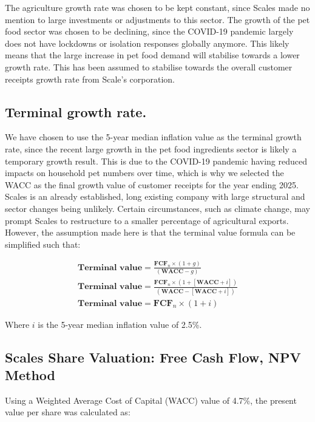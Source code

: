 \documentclass{article}
\begin{document}
The agriculture growth rate was chosen to be kept constant, since Scales made no mention to large investments or adjustments to this sector. The growth of the pet food sector was chosen to be declining, since the COVID-19 pandemic largely does not have lockdowns or isolation responses globally anymore. This likely means that the large increase in pet food demand will stabilise towards a lower growth rate. This has been assumed to stabilise towards the overall customer receipts growth rate from Scale's corporation.

\subsection{Terminal growth rate.}
We have chosen to use the 5-year median inflation value as the terminal growth rate,
since the recent large growth in the pet food ingredients sector is likely a temporary growth result. This
is due to the COVID-19 pandemic having reduced impacts on household pet numbers over time, which is why we selected the WACC as the final growth value of customer 
receipts for the year ending 2025. Scales is an already established, long existing company with large structural
and sector changes being unlikely. Certain circumstances, such as climate change, may prompt Scales to restructure
to a smaller percentage of agricultural exports. However, the assumption made here is that the terminal value formula
can be simplified such that:

\begin{equation}
\begin{split}
    \textbf{Terminal value} = \frac{\textbf{FCF}_n \times (1+g)}{(\textbf{WACC} - g)} \\
    \textbf{Terminal value} = \frac{\textbf{FCF}_n \times (1+[\textbf{WACC} + i])}{(\textbf{WACC} - [\textbf{WACC} + i])}\\
    \textbf{Terminal value} = \textbf{FCF}_n \times (1+i)
\end{split}
\end{equation}

Where $i$ is the 5-year median inflation value of 2.5\%.

\newpage
\subsection{Scales Share Valuation: Free Cash Flow, NPV Method}
Using a Weighted Average Cost of Capital (WACC) value of 4.7\%, the present value per share was calculated as:
\end{document}
